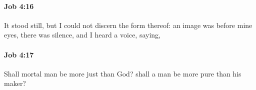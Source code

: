 		\paragraph{Job 4:16} %
			\label{JOB-4-16}

			It stood still, but I could not discern the form thereof: an image was before mine eyes, there was silence, and I heard a voice, saying,


		\paragraph{Job 4:17} %
			\label{JOB-4-17}

			Shall mortal man be more just than God? shall a man be more pure than his maker?


